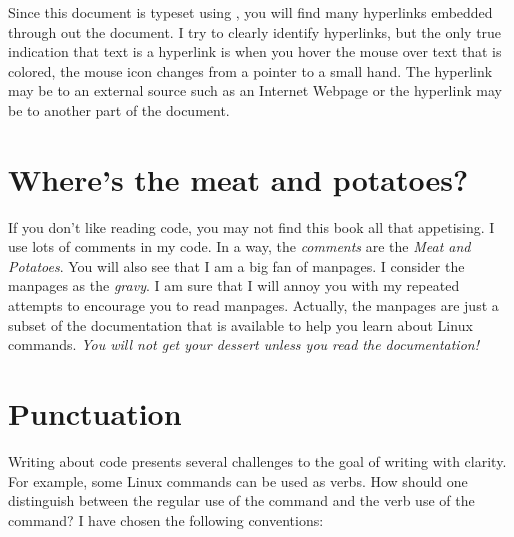 Since this document is typeset using \latex, you will find many hyperlinks embedded through out the document. I try to clearly identify hyperlinks, but the only true indication that text is a hyperlink is when you hover the mouse over text that is colored, the mouse icon changes from a pointer to a small hand. The hyperlink may be to an external source such as an Internet Webpage or the hyperlink may be to another part of the document.

\section{Where's the meat and potatoes?}

If you don't like reading code, you may not find this book all that appetising. I use lots of comments in my code. In a way, the \emph{comments} are the \emph{Meat and Potatoes}. You will also see that I am a big fan of manpages. I consider the manpages as the \emph{gravy}. I am sure that I will annoy you with my repeated attempts to encourage you to read manpages. Actually, the manpages are just a subset of the documentation that is available to help you learn about Linux commands. \textit{You will not get your \emph{dessert} unless you read the documentation!}

\section{Punctuation} 

Writing about code presents several challenges to the goal of writing with clarity. For example, some Linux commands can be used as verbs. How should one distinguish between the regular use of the command and the verb use of the command? I have chosen the following conventions:

